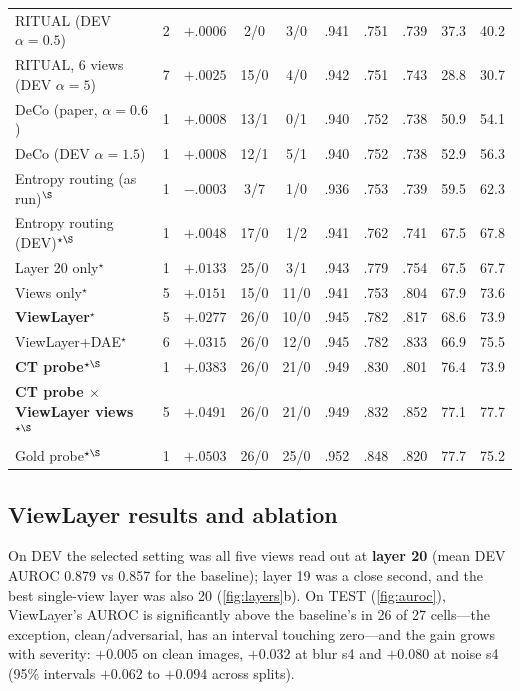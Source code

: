 \documentclass[10pt,a4paper]{article}
\newcommand{\ours}{ViewLayer}
\begin{document}
\begin{table}[t]
\begin{tabular}{@{}l c c cc ccc cc@{}}
RITUAL (DEV $\alpha{=}0.5$)   & 2 & $+.0006$ & 2/0    & 3/0    & .941 & .751 & .739 & 37.3 & 40.2\\
RITUAL, 6 views (DEV $\alpha{=}5$) & 7 & $+.0025$ & 15/0 & 4/0  & .942 & .751 & .743 & 28.8 & 30.7\\
\addlinespace
DeCo (paper, $\alpha{=}0.6$)  & 1 & $+.0008$ & 13/1   & 0/1    & .940 & .752 & .738 & 50.9 & 54.1\\
DeCo (DEV $\alpha{=}1.5$)     & 1 & $+.0008$ & 12/1   & 5/1    & .940 & .752 & .738 & 52.9 & 56.3\\
Entropy routing (as run)$^\S$ & 1 & $-.0003$ & 3/7 & 1/0 & .936 & .753 & .739 & 59.5 & 62.3\\
Entropy routing (DEV)$^{\star\S}$ & 1 & $+.0048$ & 17/0 & 1/2 & .941 & .762 & .741 & 67.5 & 67.8\\
\addlinespace
Layer 20 only$^\star$         & 1 & $+.0133$ & 25/0   & 3/1    & .943 & .779 & .754 & 67.5 & 67.7\\
Views only$^\star$            & 5 & $+.0151$ & 15/0   & 11/0   & .941 & .753 & .804 & 67.9 & 73.6\\
\rowcolor{ours}\textbf{\ours{}}$^\star$ & 5 & $+.0277$ & 26/0 & 10/0 & .945 & .782 & .817 & 68.6 & 73.9\\
\rowcolor{ours}\ours+DAE$^\star$ & 6 & $+.0315$ & 26/0 & 12/0 & .945 & .782 & .833 & 66.9 & 75.5\\
\addlinespace
\rowcolor{ours}\textbf{CT probe}$^{\star\S}$ & 1 & $+.0383$ & 26/0 & 21/0 & .949 & .830 & .801 & 76.4 & 73.9\\
\rowcolor{ours}\textbf{CT probe $\times$ \ours{} views}$^{\star\S}$ & 5 & $+.0491$ & 26/0 & 21/0 & .949 & .832 & .852 & 77.1 & 77.7\\
Gold probe$^{\star\S}$ & 1 & $+.0503$ & 26/0 & 25/0 & .952 & .848 & .820 & 77.7 & 75.2\\
\bottomrule
\end{tabular}
\end{table}

\subsection{ViewLayer results and ablation}\label{sec:vl}
On DEV the selected setting was all five views read out at \textbf{layer 20} (mean DEV AUROC 0.879 vs 0.857 for the baseline); layer 19 was a close second, and the best single-view layer was also 20 (\cref{fig:layers}b). On TEST (\cref{fig:auroc}), \ours{}'s AUROC is significantly above the baseline's in 26 of 27 cells---the exception, clean/adversarial, has an interval touching zero---and the gain grows with severity: $+0.005$ on clean images, $+0.032$ at blur s4 and $+0.080$ at noise s4 (95\% intervals $+0.062$ to $+0.094$ across splits).
\end{document}
